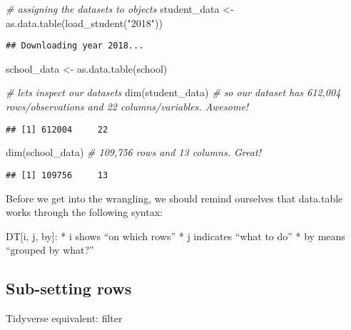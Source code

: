 \documentclass[
]{article}
\newenvironment{Shaded}{\begin{snugshade}}{\end{snugshade}}
\newcommand{\CommentTok}[1]{\textcolor[rgb]{0.56,0.35,0.01}{\textit{#1}}}
\newcommand{\FunctionTok}[1]{\textcolor[rgb]{0.00,0.00,0.00}{#1}}
\newcommand{\NormalTok}[1]{#1}
\newcommand{\OtherTok}[1]{\textcolor[rgb]{0.56,0.35,0.01}{#1}}
\newcommand{\StringTok}[1]{\textcolor[rgb]{0.31,0.60,0.02}{#1}}
\begin{document}
\begin{Shaded}
\begin{Highlighting}[]
\CommentTok{\# assigning the datasets to objects}
\NormalTok{student\_data }\OtherTok{\textless{}{-}} \FunctionTok{as.data.table}\NormalTok{(}\FunctionTok{load\_student}\NormalTok{(}\StringTok{"2018"}\NormalTok{))}
\end{Highlighting}
\end{Shaded}

\begin{verbatim}
## Downloading year 2018...
\end{verbatim}

\begin{Shaded}
\begin{Highlighting}[]
\NormalTok{school\_data }\OtherTok{\textless{}{-}} \FunctionTok{as.data.table}\NormalTok{(school)}

\CommentTok{\# let\textquotesingle{}s inspect our datasets}
\FunctionTok{dim}\NormalTok{(student\_data) }\CommentTok{\# so our dataset has 612,004 rows/observations and 22 columns/variables. Awesome!}
\end{Highlighting}
\end{Shaded}

\begin{verbatim}
## [1] 612004     22
\end{verbatim}

\begin{Shaded}
\begin{Highlighting}[]
\FunctionTok{dim}\NormalTok{(school\_data) }\CommentTok{\# 109,756 rows and 13 columns. Great!}
\end{Highlighting}
\end{Shaded}

\begin{verbatim}
## [1] 109756     13
\end{verbatim}

Before we get into the wrangling, we should remind ourselves that
data.table works through the following syntax:

DT{[}i, j, by{]}: * i shows ``on which rows'' * j indicates ``what to
do'' * by means ``grouped by what?''

\hypertarget{sub-setting-rows}{%
\subsection{Sub-setting rows}\label{sub-setting-rows}}

{Tidyverse equivalent: filter}
\end{document}

